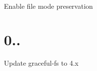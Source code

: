 
\begin{DoxyItemize}
\item Enable file mode preservation
\end{DoxyItemize}

\section*{0..}


\begin{DoxyItemize}
\item Update graceful-\/fs to 4.\+x 
\end{DoxyItemize}